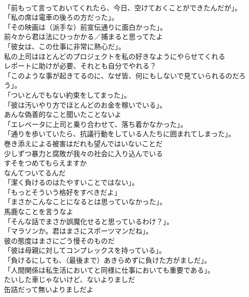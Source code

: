 \documentclass[8pt]{extreport}
\begin{document}
\begin{CJK}{UTF8}{min}
\\	「前もって言っておいてくれたら、今日、空けておくことができたんだが」。	
\\	「私の席は電車の後ろの方だった」。	
\\	「その映画は（派手な）前宣伝通りに面白かった」。	
\\	前々から君は法にひっかかる／捕まると思ってたよ	
\\	「彼女は、この仕事に非常に熱心だ」。	
\\	私の上司はほとんどのプロジェクトを私の好きなようにやらせてくれる	
\\	レポートに助けが必要、それとも自分でやれる？	
\\	「このような事が起きてるのに、なぜ皆、何にもしないで見ていられるのだろう」。	
\\	「ついとんでもない約束をしてまった」。	
\\	「彼は汚いやり方でほとんどのお金を稼いでいる」。	
\\	あんな偽善的なこと聞いたことないよ	
\\	「エレベータに上司と乗り合わせて、落ち着かなかった」。	
\\	「通りを歩いていたら、抗議行動をしている人たちに囲まれてしまった」。	
\\	巻き添えによる被害はだれも望んではいないことだ	
\\	少しずつ暴力と腐敗が我々の社会に入り込んでいる	
\\	すそをつめてもらえますか	
\\	なんてついてるんだ	
\\	「潔く負けるのはたやすいことではない」。	
\\	「もっとそういう格好をすべきだよ」	
\\	「まさかこんなことになるとは思っていなかった」。	
\\	馬鹿なことを言うなよ	
\\	「そんな話でまさか誤魔化せると思っているわけ？」。	
\\	「マラソンか。君はまさにスポーツマンだね」。	
\\	彼の態度はまさにごう慢そのものだ	
\\	「彼は母親に対してコンプレックスを持っている」。	
\\	「負けるにしても、（最後まで）あきらめずに負けた方がましだ」。	
\\	「人間関係は私生活においてと同様に仕事においても重要である」。	
\\	たいした車じゃないけど、ないよりましだ	
\\	缶詰だって無いよりましだよ	

\end{CJK}
\end{document}
